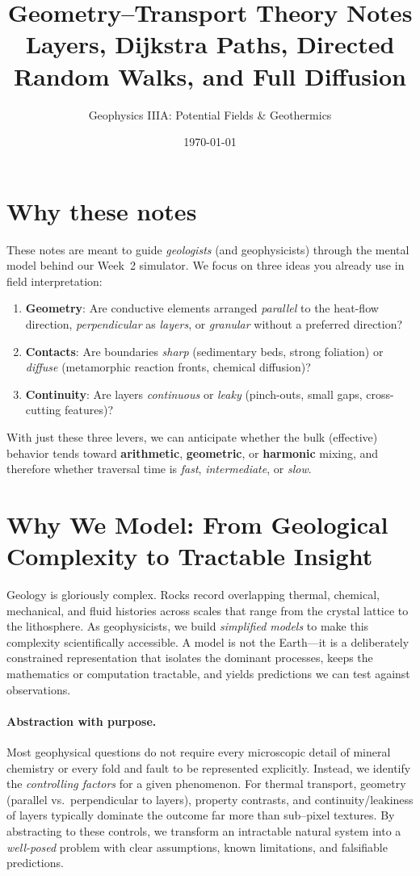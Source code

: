 \documentclass[11pt,a4paper]{article}
\title{Geometry--Transport Theory Notes\\[0.3em]
\large Layers, Dijkstra Paths, Directed Random Walks, and Full Diffusion}
\author{Geophysics IIIA: Potential Fields \& Geothermics}
\date{\today}
\begin{document}
\maketitle

\section*{Why these notes}
These notes are meant to guide \emph{geologists} (and geophysicists) through the mental model behind our Week~2 simulator. We focus on three ideas you already use in field interpretation:
\begin{enumerate}[leftmargin=*]
  \item \textbf{Geometry}: Are conductive elements arranged \emph{parallel} to the heat-flow direction, \emph{perpendicular} as \emph{layers}, or \emph{granular} without a preferred direction?
  \item \textbf{Contacts}: Are boundaries \emph{sharp} (sedimentary beds, strong foliation) or \emph{diffuse} (metamorphic reaction fronts, chemical diffusion)?
  \item \textbf{Continuity}: Are layers \emph{continuous} or \emph{leaky} (pinch-outs, small gaps, cross-cutting features)?
\end{enumerate}
With just these three levers, we can anticipate whether the bulk (effective) behavior tends toward \textbf{arithmetic}, \textbf{geometric}, or \textbf{harmonic} mixing, and therefore whether traversal time is \emph{fast}, \emph{intermediate}, or \emph{slow}.

\section{Why We Model: From Geological Complexity to Tractable Insight}
Geology is gloriously complex. Rocks record overlapping thermal, chemical, mechanical, and fluid histories across scales that range from the crystal lattice to the lithosphere. As geophysicists, we build \emph{simplified models} to make this complexity scientifically accessible. A model is not the Earth—it is a deliberately constrained representation that isolates the dominant processes, keeps the mathematics or computation tractable, and yields predictions we can test against observations.

\paragraph{Abstraction with purpose.}
Most geophysical questions do not require every microscopic detail of mineral chemistry or every fold and fault to be represented explicitly. Instead, we identify the \emph{controlling factors} for a given phenomenon. For thermal transport, geometry (parallel vs.\ perpendicular to layers), property contrasts, and continuity/leakiness of layers typically dominate the outcome far more than sub--pixel textures. By abstracting to these controls, we transform an intractable natural system into a \emph{well-posed} problem with clear assumptions, known limitations, and falsifiable predictions.
\end{document}
